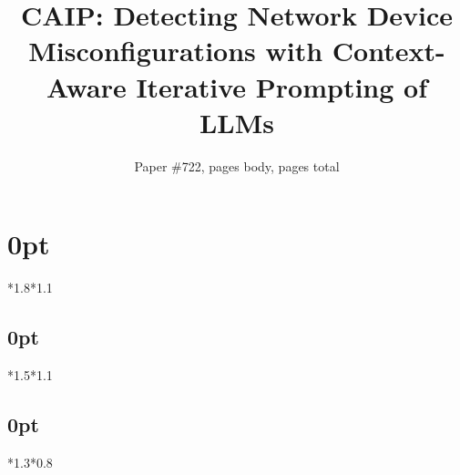 \usepackage{caption}
\usepackage{ltablex}

\usepackage{ifluatex}

\usepackage{outlines}
\newtheorem{insight}{Insight}

\captionsetup[figure]{belowskip=0pt}
\captionsetup[figure]{skip=0pt}
\captionsetup[table]{belowskip=0pt}
\captionsetup[table]{skip=0pt}


\usepackage[compact]{titlesec}
\renewcommand{\paragraph}[1]{\noindent\textbf{#1}}
\setlength{\textfloatsep}{5pt plus 0pt minus 2.0pt}
\titlespacing\section{0pt}{*1.8}{*1.1}
\titlespacing\subsection{0pt}{*1.5}{*1.1}
\titlespacing\subsection{0pt}{*1.3}{*0.8}
\usepackage{booktabs}



\newcommand*{\affmark}[1][*]{\textsuperscript{#1}}
\newcommand*{\affaddr}[1]{#1}


\title{CAIP: Detecting Network Device Misconfigurations with Context-Aware Iterative Prompting of LLMs}
\author{Paper \#722, \pageref{endOfBody} pages body, \pageref{LastPage} pages total}
\newcommand{\eg}{{\it e.g.}}
\newcommand{\ie}{{\it i.e.}}
\newcommand{\etal}{{\it et al.}}
\newcommand{\sysname}{{CAIP}}

\maketitle


